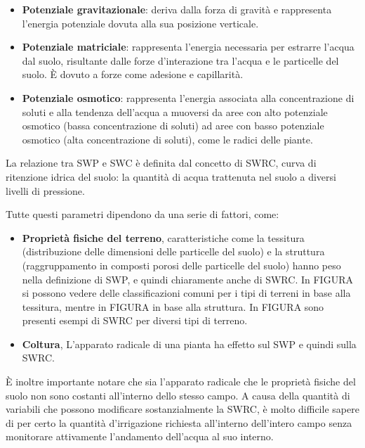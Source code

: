 \documentclass[12pt,a4paper,openright,twoside]{book}
\begin{document}
\begin{itemize}[noitemsep]
    \item \textbf{Potenziale gravitazionale}: deriva dalla forza di gravità e rappresenta l'energia potenziale dovuta alla sua posizione verticale\cite{MarshallT.J.TheoJohn1996Sp}.
    \item \textbf{Potenziale matriciale}: rappresenta l'energia necessaria per estrarre l'acqua dal suolo, risultante dalle forze d'interazione tra l'acqua e le particelle del suolo. È dovuto a forze come adesione e capillarità\cite{MarshallT.J.TheoJohn1996Sp}.
    \item \textbf{Potenziale osmotico}: rappresenta l'energia associata alla concentrazione di soluti e alla tendenza dell'acqua a muoversi da aree con alto potenziale osmotico (bassa concentrazione di soluti) ad aree con basso potenziale osmotico (alta concentrazione di soluti), come le radici delle piante\cite{MarshallT.J.TheoJohn1996Sp}.
\end{itemize}


La relazione tra \ac{SWP} e \ac{SWC} è definita dal concetto di \ac{SWRC}, curva di ritenzione idrica del suolo: la quantità di acqua trattenuta nel suolo a diversi livelli di pressione\cite{assouline1998water}.

Tutte questi parametri dipendono da una serie di fattori, come:
\begin{itemize}[noitemsep]
    \item \textbf{Proprietà fisiche del terreno}, caratteristiche come la tessitura (distribuzione delle dimensioni delle particelle del suolo) e la struttura (raggruppamento in composti porosi delle particelle del suolo) hanno peso nella definizione di \ac{SWP}, e quindi chiaramente anche di \ac{SWRC}\cite{jury1990soil}. In FIGURA si possono vedere delle classificazioni comuni per i tipi di terreni in base alla tessitura, mentre in FIGURA in base alla struttura. In FIGURA sono presenti esempi di \ac{SWRC} per diversi tipi di terreno.
    \item \textbf{Coltura}, L'apparato radicale di una pianta ha effetto sul \ac{SWP} e quindi sulla \ac{SWRC}\cite{XIAO2024167524}.
\end{itemize}

È inoltre importante notare che sia l'apparato radicale che le proprietà fisiche del suolo non sono costanti all'interno dello stesso campo. A causa della quantità di variabili che possono modificare sostanzialmente la \ac{SWRC}, è molto difficile sapere di per certo la quantità d'irrigazione richiesta all'interno dell'intero campo senza monitorare attivamente l'andamento dell'acqua al suo interno.
\end{document}
